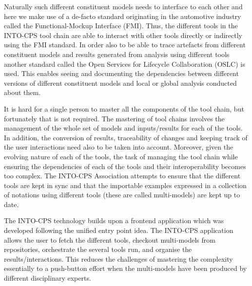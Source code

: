 Naturally such different constituent models needs to interface to each other and here we make use of a de-facto standard originating in the automotive industry called the Functional-Mockup Interface (FMI). Thus, the different tools in the INTO-CPS tool chain are able to interact with other tools directly or indirectly using the FMI standard. In order also to be able to trace artefacts from different constituent models and results generated from analysis using different tools another standard called the Open Services for Lifecycle Collaboration (OSLC) is used. This enables seeing and documenting the dependencies between different versions of different constituent models and local or global analysis conducted about them.

It is hard for a single person to master all the components of the tool
chain, but fortunately that is not required.  The mastering of tool chains involves the management of the whole set
of models and inputs/results for each of the tools. In addition, the conversion
of results, traceability of changes and keeping track of the user interactions
need also to be taken into account.  Moreover, given the evolving nature of
each of the tools, the task of managing the tool chain while ensuring the
dependencies of each of the tools and their interoperability becomes too
complex. The INTO-CPS Association attempts to ensure that the different tools are kept in sync and that the importable examples expressed in a collection of notations using different tools (these are called multi-models) are kept up to date.


The INTO-CPS technology builds upon a frontend application which was developed following the
unified entry point idea.  The INTO-CPS application allows the user to fetch
the different tools, checkout multi-models from repositories, orchestrate the
several tools run, and organise the results/interactions.  This reduces the
challenges of mastering the complexity essentially to a push-button effort when the multi-models have been produced by different disciplinary experts.
 


